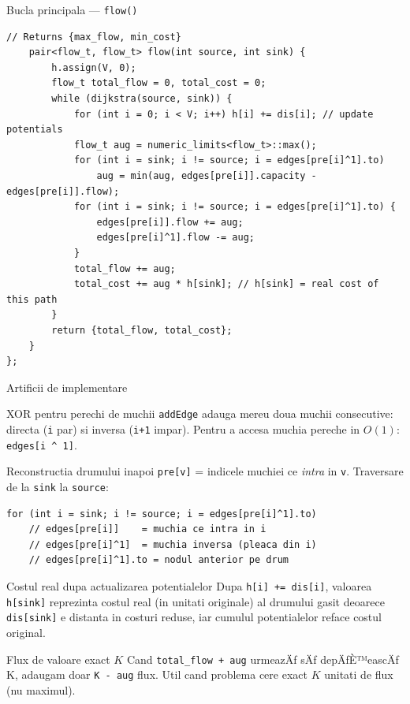 ﻿\documentclass[9pt]{beamer}
\begin{document}
\begin{frame}[fragile]{Bucla principala --- \texttt{flow()}}
  \begin{lstlisting}[belowskip=0pt]
    // Returns {max_flow, min_cost}
    pair<flow_t, flow_t> flow(int source, int sink) {
        h.assign(V, 0);
        flow_t total_flow = 0, total_cost = 0;
        while (dijkstra(source, sink)) {
            for (int i = 0; i < V; i++) h[i] += dis[i]; // update potentials
            flow_t aug = numeric_limits<flow_t>::max();
            for (int i = sink; i != source; i = edges[pre[i]^1].to)
                aug = min(aug, edges[pre[i]].capacity - edges[pre[i]].flow);
            for (int i = sink; i != source; i = edges[pre[i]^1].to) {
                edges[pre[i]].flow += aug;
                edges[pre[i]^1].flow -= aug;
            }
            total_flow += aug;
            total_cost += aug * h[sink]; // h[sink] = real cost of this path
        }
        return {total_flow, total_cost};
    }
};
  \end{lstlisting}
\end{frame}

\begin{frame}[fragile]{Artificii de implementare}
  \begin{block}{XOR pentru perechi de muchii}
    \lstinline|addEdge| adauga mereu doua muchii consecutive: directa (\lstinline|i| par)
    si inversa (\lstinline|i+1| impar). Pentru a accesa muchia pereche in $O(1)$: \lstinline|edges[i ^ 1]|.\\
  \end{block}
  \begin{block}{Reconstructia drumului inapoi}
    \lstinline|pre[v]| = indicele muchiei ce \textit{intra} in \lstinline|v|.
    Traversare de la \lstinline|sink| la \lstinline|source|:
    \begin{lstlisting}[belowskip=0pt]
for (int i = sink; i != source; i = edges[pre[i]^1].to)
    // edges[pre[i]]    = muchia ce intra in i
    // edges[pre[i]^1]  = muchia inversa (pleaca din i)
    // edges[pre[i]^1].to = nodul anterior pe drum
    \end{lstlisting}
  \end{block}
  \begin{block}{Costul real dupa actualizarea potentialelor}
    Dupa \lstinline|h[i] += dis[i]|, valoarea \lstinline|h[sink]| reprezinta
    costul real (in unitati originale) al drumului gasit \textemdash{}
    deoarece \lstinline|dis[sink]| e distanta in costuri reduse, iar cumulul
    potentialelor reface costul original.
  \end{block}
  \begin{block}{Flux de valoare exact $K$}
    Cand \lstinline|total_flow + aug| urmeazÄƒ sÄƒ depÄƒÈ™eascÄƒ K, adaugam doar \lstinline|K - aug| flux. Util cand problema cere
    exact $K$ unitati de flux (nu maximul).
  \end{block}
\end{frame}
\end{document}
